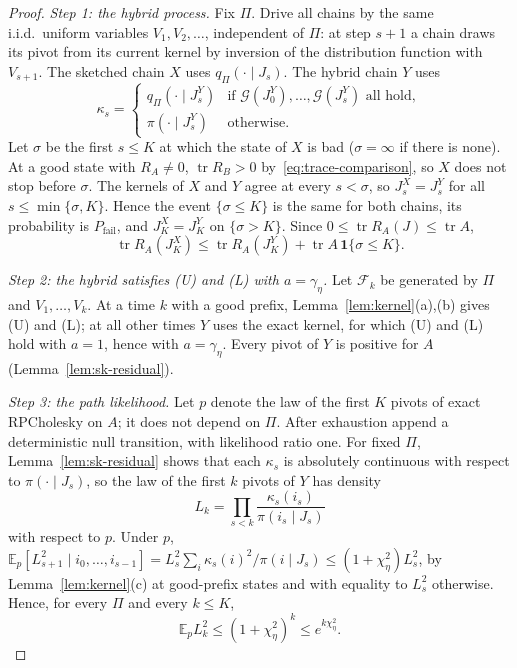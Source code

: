 \documentclass[11pt]{article}
\theoremstyle{definition}\newtheorem{definition}[theorem]{Definition}
\theoremstyle{remark}\newtheorem{remark}[theorem]{Remark}
\newcommand{\E}{\mathbb E}
\newcommand{\tr}{\operatorname{tr}}
\newcommand{\calG}{\mathcal G}
\newcommand{\calF}{\mathcal F}
\newcommand{\1}{\mathbf 1}
\newcommand{\Pfail}{P_{\mathrm{fail}}}
\begin{document}
\begin{proof}
\emph{Step 1: the hybrid process.} Fix $\Pi$. Drive all chains by the
same i.i.d.\ uniform variables $V_1,V_2,\dots$, independent of $\Pi$:
at step $s+1$ a chain draws its pivot from its current kernel by
inversion of the distribution function with $V_{s+1}$. The sketched
chain $X$ uses $q_\Pi(\cdot\mid J_s)$. The hybrid chain $Y$ uses
\[
 \kappa_s=\begin{cases}
 q_\Pi(\cdot\mid J^Y_s)&\text{if }\calG(J^Y_0),\dots,\calG(J^Y_s)\text{ all hold},\\
 \pi(\cdot\mid J^Y_s)&\text{otherwise.}\end{cases}
\]
Let $\sigma$ be the first $s\le K$ at which the state of $X$ is bad
($\sigma=\infty$ if there is none). At a good state with $R_A\ne0$,
$\tr R_B>0$ by~\eqref{eq:trace-comparison}, so $X$ does not stop
before $\sigma$. The kernels of $X$ and $Y$ agree at every $s<\sigma$,
so $J^X_s=J^Y_s$ for all $s\le\min\{\sigma,K\}$. Hence the event
$\{\sigma\le K\}$ is the same for both chains, its probability is
$\Pfail$, and $J^X_K=J^Y_K$ on $\{\sigma>K\}$. Since
$0\le\tr R_A(J)\le\tr A$,
\begin{equation}\label{eq:hybrid-split}
 \tr R_A(J^X_K)\le\tr R_A(J^Y_K)+\tr A\,\1\{\sigma\le K\}.
\end{equation}

\emph{Step 2: the hybrid satisfies (U) and (L) with $a=\gamma_\eta$.}
Let $\calF_k$ be generated by $\Pi$ and $V_1,\dots,V_k$. At a time $k$
with a good prefix, Lemma~\ref{lem:kernel}(a),(b) gives (U) and (L);
at all other times $Y$ uses the exact kernel, for which (U) and (L)
hold with $a=1$, hence with $a=\gamma_\eta$. Every pivot of $Y$ is
positive for $A$ (Lemma~\ref{lem:sk-residual}).

\emph{Step 3: the path likelihood.} Let $p$ denote the law of the first
$K$ pivots of exact RPCholesky on $A$; it does not depend on $\Pi$.
After exhaustion append a deterministic null transition, with likelihood
ratio one. For fixed $\Pi$, Lemma~\ref{lem:sk-residual} shows that each $\kappa_s$ is
absolutely continuous with respect to $\pi(\cdot\mid J_s)$, so the law
of the first $k$ pivots of $Y$ has density
\[
 L_k=\prod_{s<k}\frac{\kappa_s(i_s)}{\pi(i_s\mid J_s)}
\]
with respect to $p$. Under $p$, $\E_p[L_{s+1}^2\mid i_0,\dots,i_{s-1}]
=L_s^2\sum_i\kappa_s(i)^2/\pi(i\mid J_s)\le(1+\chi^2_\eta)L_s^2$, by
Lemma~\ref{lem:kernel}(c) at good-prefix states and with equality to
$L_s^2$ otherwise. Hence, for every $\Pi$ and every $k\le K$,
\begin{equation}\label{eq:L2}
 \E_pL_k^2\le(1+\chi^2_\eta)^k\le e^{k\chi^2_\eta}.
\end{equation}


\end{proof}
\end{document}
